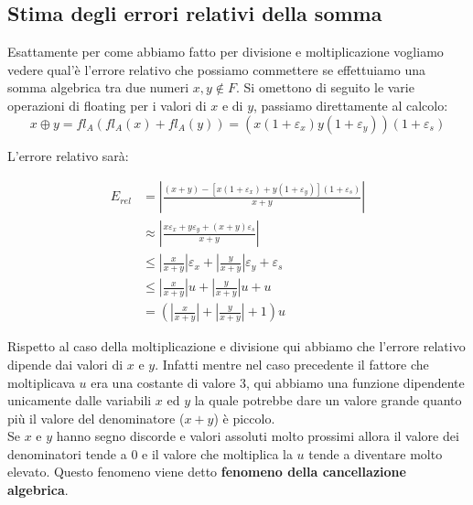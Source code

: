 \documentclass[12pt, a4paper]{book}
\theoremstyle{definition}
\begin{document}
\subsection{Stima degli errori relativi della somma}
\begin{flushleft}
Esattamente per come abbiamo fatto per divisione e moltiplicazione vogliamo vedere qual'è l'errore relativo che possiamo commettere se effettuiamo una somma algebrica tra due numeri $x,y \notin F$. 
Si omettono di seguito le varie operazioni di floating per i valori di $x$ e di $y$,  passiamo direttamente al calcolo: 
\[ x \oplus y = fl_{A}(fl_{A}(x) + fl_{A}(y)) = (x(1+\varepsilon_{x})y(1+\varepsilon_{y}))(1+\varepsilon_{s}) \]

L'errore relativo sarà: 

\begin{equation} \label{}
	\begin{split}
		E_{rel}  &=  \displaystyle\left\lvert \frac{(x+y) - [x(1+ \varepsilon_{x}) + y(1+\varepsilon_{y})](1+\varepsilon_{s}) }{x+y}   \right\rvert \\
					&\approx \displaystyle\left\lvert \frac{x\varepsilon_{x} + y\varepsilon_{y} + (x+y)\varepsilon_{s}}{x+y}   \right\rvert \\
					&\leq  \displaystyle\left\lvert \frac{x}{x+y} \right\rvert \varepsilon_{x } + \displaystyle\left\lvert \frac{y}{x+y} \right\rvert \varepsilon_{y} + \varepsilon_{s} \\
					&\leq \displaystyle\left\lvert \frac{x}{x+y} \right\rvert u + \displaystyle\left\lvert \frac{y}{x+y} \right\rvert u +  u\\
					&= \left( \displaystyle\left\lvert \frac{x}{x+y} \right\rvert +  \displaystyle\left\lvert \frac{y}{x+y} \right\rvert + 1 \right)u
	\end{split}
\end{equation}

Rispetto al caso della moltiplicazione e divisione qui abbiamo che l'errore relativo dipende dai valori di $x$ e $y$. Infatti mentre nel caso precedente il fattore che moltiplicava $u$ era una costante di valore 3, qui abbiamo una funzione dipendente unicamente dalle variabili $x$ ed $y$ la quale potrebbe dare un valore grande quanto più il valore del denominatore ($x+y$) è piccolo. \\
Se $x$ e $y$ hanno segno discorde e valori  assoluti molto prossimi allora il valore dei denominatori tende a 0 e il valore che moltiplica la $u$ tende a diventare molto elevato.
Questo fenomeno viene detto \textbf{fenomeno della cancellazione algebrica}.  
\end{flushleft}
\end{document}

